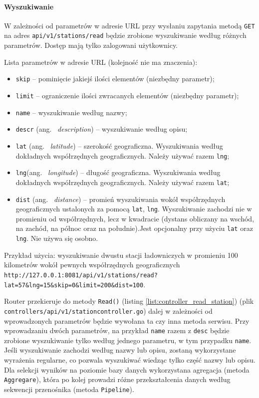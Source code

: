 \paragraph{Wyszukiwanie\newline}
W zależności od parametrów w adresie URL przy wysłaniu zapytania metodą \texttt{GET} na adres \texttt{api/v1/stations/read} będzie zrobione wyszukiwanie według różnych parametrów.
Dostęp mają tylko zalogowani użytkownicy.

Lista parametrów w adresie URL (kolejność nie ma znaczenia):
\begin{itemize}
    \item \texttt{skip} -- pominięcie jakiejś ilości elementów (niezbędny parametr);
    \item \texttt{limit} -- ograniczenie ilości zwracanych elementów (niezbędny parametr);
    \item \texttt{name} -- wyszukiwanie według nazwy;
    \item \texttt{descr} (ang. ~\emph{description}) -- wyszukiwanie według opisu;
    \item \texttt{lat} (ang. ~\emph{latitude}) -- szerokość geograficzna. Wyszukiwania według dokładnych współrzędnych geograficznych. Należy używać razem \texttt{lng};
    \item \texttt{lng}(ang. ~\emph{longitude}) -- długość geograficzna. Wyszukiwania według dokładnych współrzędnych geograficznych. Należy używać razem \texttt{lat};
    \item \texttt{dist} (ang. ~\emph{distance}) -- promień wyszukiwania wokół współrzędnych geograficznych ustalonych za pomocą \texttt{lat}, \texttt{lng}. Wyszukiwanie zachodzi nie w promieniu od współrzędnych, lecz w kwadracie (dystans obliczany na wschód, na zachód, na północ oraz na południe).Jest opcjonalny przy użyciu \texttt{lat} oraz \texttt{lng}. Nie używa się osobno.
\end{itemize}

Przykład użycia: wyszukiwanie dwustu stacji ładowniczych w promieniu 100 kilometrów wokół pewnych współrzędnych geograficznych \texttt{http://127.0.0.1:8081/api/v1/stations/read?lat=57\&lng=15\&skip=0\&limit=200\&dist=100}.

Router przekieruje do metody \texttt{Read()} (listing \ref{list:controller_read_station}) (plik \texttt{controllers/api/v1/stationcontroller.go}) dalej w zależności od wprowadzonych parametrów będzie wywołana ta czy inna metoda serwisu.
Przy wprowadzaniu dwóch parametrów, na przykład \texttt{name} razem z \texttt{desc} będzie zrobione wyszukiwanie tylko według jednego parametru, w tym przypadku \texttt{name}. Jeśli wyszukiwanie zachodzi według nazwy lub opisu, zostaną wykorzystane wyrażenia regularne, co pozwala wyszukiwać wiedząc tylko część nazwy lub opisu.
Dla selekcji wyników na poziomie bazy danych wykorzystana agregacja (metoda \texttt{Aggregare}), która po kolej prowadzi różne przekształcenia danych według sekwencji przenośnika (metoda \texttt{Pipeline}).

